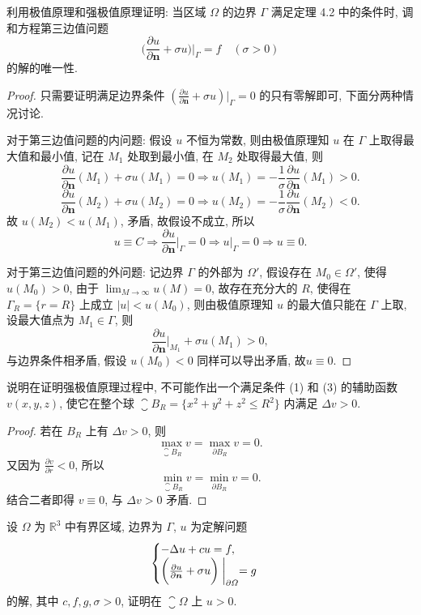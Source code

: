 \begin{exercise}
  利用极值原理和强极值原理证明: 当区域 $\varOmega$ 的边界 $\varGamma$
  满足定理 4.2 中的条件时, 调和方程第三边值问题
  \[\biggl(\frac{\partial u}{\partial \bm{n}} + \sigma u\biggr)\bigg|_{\varGamma}
    = f \quad (\sigma>0)\]
  的解的唯一性.
\end{exercise}

\begin{proof}
  只需要证明满足边界条件 $(\frac{\partial u}{\partial\bm{n}}+\sigma u)|_{\varGamma}=0$ 的只有零解即可,
  下面分两种情况讨论.

  对于第三边值问题的内问题: 假设 $u$ 不恒为常数, 则由极值原理知 $u$ 在 $\varGamma$ 上取得最大值和最小值,
  记在 $M_1$ 处取到最小值, 在 $M_2$ 处取得最大值, 则
  \[\frac{\partial u}{\partial\bm{n}}(M_1) + \sigma u(M_1) = 0
    \Rightarrow u(M_1) = -\frac{1}{\sigma}\frac{\partial u}{\partial\bm{n}}(M_1)>0.\]
  \[\frac{\partial u}{\partial\bm{n}}(M_2) + \sigma u(M_2) = 0
    \Rightarrow u(M_2) = -\frac{1}{\sigma}\frac{\partial u}{\partial\bm{n}}(M_2)<0.\]
  故 $u(M_2)<u(M_1)$, 矛盾, 故假设不成立, 所以
  \[u\equiv C\Rightarrow\frac{\partial u}{\partial\bm{n}}\bigg|_{\varGamma} = 0
    \Rightarrow u|_{\varGamma}=0\Rightarrow u\equiv 0.\]
  
  对于第三边值问题的外问题: 记边界 $\varGamma$ 的外部为 $\varOmega'$,
  假设存在 $M_0\in\varOmega'$, 使得 $u(M_0)>0$, 由于 $\lim_{M\to\infty}u(M)=0$,
  故存在充分大的 $R$, 使得在 $\varGamma_R = \{r=R\}$ 上成立 $|u|<u(M_0)$,
  则由极值原理知 $u$ 的最大值只能在 $\varGamma$ 上取, 设最大值点为 $M_1\in\varGamma$, 则
  \[\frac{\partial u}{\partial\bm{n}}\bigg|_{M_1}+\sigma u(M_1)>0,\]
  与边界条件相矛盾, 假设 $u(M_0)<0$ 同样可以导出矛盾, 故$u\equiv 0$.
\end{proof}


\begin{exercise}
  说明在证明强极值原理过程中, 不可能作出一个满足条件 (1) 和 (3) 的辅助函数 $v(x,y,z)$,
  使它在整个球 $\closure{B}_R = \{x^2+y^2+z^2 \leq R^2\}$ 内满足 $\Delta v>0$.
\end{exercise}

\begin{proof}
  若在 $B_R$ 上有 $\Delta v>0$, 则
  \[\max_{\closure{B}_R} v = \max_{\partial B_R} v = 0.\]
  又因为 $\frac{\partial v}{\partial r} < 0$, 所以
  \[\min_{\closure{B}_R} v = \min_{\partial B_R} v = 0.\]
  结合二者即得 $v\equiv 0$, 与 $\Delta v>0$ 矛盾.
\end{proof}


\begin{exercise}
  设 $\varOmega$ 为 $\mathbb{R}^3$ 中有界区域, 边界为 $\varGamma$, $u$ 为定解问题
  \[\begin{cases}
    - \Delta u + cu = f, \\
    \biggl(\frac{\partial u}{\partial \bm{n}} + \sigma u\biggr)\biggm|_{\partial\varOmega} = g
  \end{cases}\]
  的解, 其中 $c,f,g,\sigma>0$, 证明在 $\closure{\varOmega}$ 上 $u>0$.
\end{exercise}



